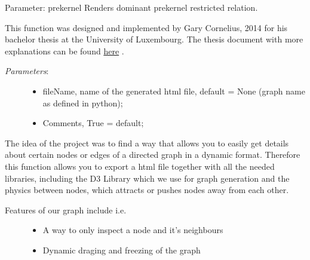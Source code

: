 \documentclass[letterpaper,10pt,english]{sphinxmanual}
\begin{document}
\begin{fulllineitems}

\begin{fulllineitems}
\label{techDoc:digraphs.Digraph.domkernelrestrict}
Parameter: prekernel
Renders dominant prekernel restricted relation.

\end{fulllineitems}


\begin{fulllineitems}
\label{techDoc:digraphs.Digraph.exportD3}
This function was designed and implemented by Gary Cornelius, 2014 for his bachelor thesis at the University of Luxembourg. 
The thesis document with more explanations can be found
\href{http://leopold-loewenheim.uni.lu/Digraph3/literature/}{here} .
\begin{description}
\item[{\emph{Parameters}:}] \leavevmode\begin{itemize}
\item {} 
fileName, name of the generated html file, default = None (graph name as defined in python);

\item {} 
Comments, True = default;

\end{itemize}

\end{description}

The idea of the project was to find a way that allows you to easily get details about certain nodes or edges of a directed graph in a dynamic format. 
Therefore this function allows you to export a html file together with all the needed libraries, including the 
D3 Library which we use for graph generation and the physics between nodes, which attracts or pushes nodes away from each other.
\begin{description}
\item[{Features of our graph include i.e.}] \leavevmode{[}{]}\begin{itemize}
\item {} 
A way to only inspect a node and it's neighbours

\item {} 
Dynamic draging and freezing of the graph


\end{itemize}
\end{description}
\end{fulllineitems}
\end{fulllineitems}
\end{document}
